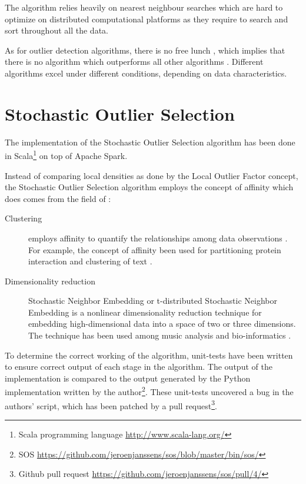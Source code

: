The algorithm relies heavily on nearest neighbour searches which are hard to optimize on distributed computational platforms as they require to search and sort throughout all the data.

As for outlier detection algorithms, there is no free lunch \cite{Wolpert95nofree}, which implies that there is no algorithm which outperforms all other algorithms \cite{outlierselection}. Different algorithms excel under different conditions, depending on data characteristics.

\section{Stochastic Outlier Selection \label{sec:sos}}

The implementation of the Stochastic Outlier Selection algorithm has been done in Scala\footnote{Scala programming language \url{http://www.scala-lang.org/}} on top of Apache Spark.

Instead of comparing local densities as done by the Local Outlier Factor concept, the Stochastic Outlier Selection algorithm employs the concept of affinity which does comes from the field of \cite{ictdbid:2777,AISTATS09_Maaten}:

\begin{description}
  \item[Clustering] employs affinity to quantify the relationships among data observations \cite{Frey2007}. For example, the concept of affinity been used for partitioning protein interaction \cite{pmid19331680} and clustering of text \cite{10.1109/TKDE.2010.144}.
  \item[Dimensionality reduction] Stochastic Neighbor Embedding \cite{NIPS20022276} or t-distributed Stochastic Neighbor Embedding \cite{van2008visualizing,ictdbid:2777} is a nonlinear dimensionality reduction technique for embedding high-dimensional data into a space of two or three dimensions. The technique has been used among music analysis \cite{Hamel+al:2010} and bio-informatics \cite{journals/bioinformatics/WallachL09}.
\end{description}

To determine the correct working of the algorithm, unit-tests have been written to ensure correct output of each stage in the algorithm. The output of the implementation is compared to the output generated by the Python implementation written by the author\footnote{SOS \url{https://github.com/jeroenjanssens/sos/blob/master/bin/sos/}}. These unit-tests uncovered a bug in the authors' script, which has been patched by a pull request\footnote{Github pull request \url{https://github.com/jeroenjanssens/sos/pull/4/}}.

